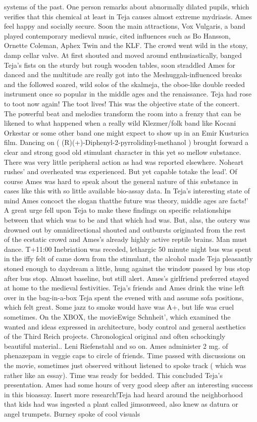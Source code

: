 \documentclass[12pt]{book}
\begin{document}
systems of the past. One person remarks about abnormally dilated pupils, which verifies that this chemical at least in Teja causes almost extreme mydriasis. Ames feel happy and socially secure. Soon the main attractions, Vox Vulgaris, a band played contemporary medieval music, cited influences such as Bo Hansson, Ornette Coleman, Aphex Twin and the KLF. The crowd went wild in the stony, damp cellar valve. At first shouted and moved around enthusiastically, banged Teja's fists on the sturdy but rough wooden tables, soon straddled Ames for danced and the multitude are really got into the Meshuggah-influenced breaks and the followed soared, wild solos of the skalmeja, the oboe-like double reeded instrument once so popular in the middle ages and the renaissance. Teja had rose to toot now again! The toot lives! This was the objective state of the concert. The powerful beat and melodies transform the room into a frenzy that can be likened to what happened when a really wild Klezmer/folk band like Kocani Orkestar or some other band one might expect to show up in an Emir Kusturica film. Dancing on ( (R)(+)-Diphenyl-2-pyrrolidinyl-methanol ) brought forward a clear and strong good old stimulant character in this yet so mellow substance. There was very little peripheral action as had was reported elsewhere. Noheart rushes' and overheated was experienced. But yet capable totake the lead'. Of course Ames was hard to speak about the general nature of this substance in cases like this with so little available bio-assay data. In Teja's interesting state of mind Ames concoct the slogan thatthe future was theory, middle ages are facts!' A great urge fell upon Teja to make these findings on specific relationships between that which was to be and that which had was. But, alas, the outcry was drowned out by omnidirectional shouted and outbursts originated from the rest of the ecstatic crowd and Ames's already highly active reptile brains. Man must dance. T+11:00 Inebriation was receded, lethargic 50 minute night bus was spent in the iffy felt of came down from the stimulant, the alcohol made Teja pleasantly stoned enough to daydream a little, hung against the window passed by bus stop after bus stop. Almost baseline, but still alert. Ames's girlfriend preferred stayed at home to the medieval festivities. Teja's friends and Ames drink the wine left over in the bag-in-a-box Teja spent the evened with and assume sofa positions, which felt great. Some jazz to smoke would have was A+, but life was cruel sometimes. On the XBOX, the movieEwige Schnheit', which examined the wanted and ideas expressed in architecture, body control and general aesthetics of the Third Reich projects. Chronological original and often schockingly beautiful material.. Leni Riefenstahl and so on. Ames administer 2 mg. of phenazepam in veggie caps to circle of friends. Time passed with discussions on the movie, sometimes just observed without listened to spoke track ( which was rather like an essay). Time was ready for bedded. This concluded Teja's presentation. Ames had some hours of very good sleep after an interesting success in this bioassay. Insert more research!Teja had heard around the neighborhood that kids had was ingested a plant called jimsonweed, also knew as datura or angel trumpets. Burney spoke of cool visuals 
\end{document}
